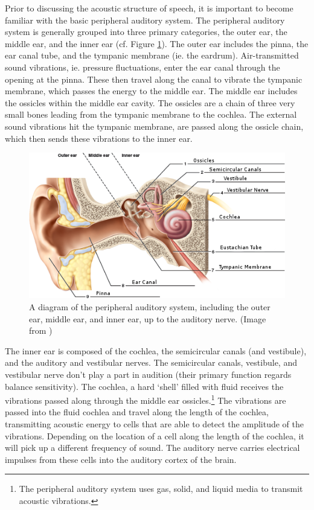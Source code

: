 \documentclass[dissertation,copyright]{uathesis}
\begin{document}
Prior to discussing the acoustic structure of speech, it is important to become familiar with the basic peripheral auditory system.  The peripheral auditory system is generally grouped into three primary categories, the outer ear, the middle ear, and the inner ear (cf. Figure \ref{fig:ear-anatomy}).  The outer ear includes the pinna, the ear canal tube, and the tympanic membrane (ie. the eardrum).  Air-transmitted sound vibrations, ie. pressure fluctuations, enter the ear canal through the opening at the pinna.  These then travel along the canal to vibrate the tympanic membrane, which passes the energy to the middle ear.  The middle ear includes the ossicles within the middle ear cavity.  The ossicles are a chain of three very small bones leading from the tympanic membrane to the cochlea. The external sound vibrations hit the tympanic membrane, are passed along the ossicle chain, which then sends these vibrations to the inner ear.

\begin{figure}[h]
\centering
  \includegraphics{figure/ear_anatomy.png}
  \caption{A diagram of the peripheral auditory system, including the outer ear, middle ear, and inner ear, up to the auditory nerve. (Image from \cite{martin:12})}
  \label{fig:ear-anatomy}
\end{figure}

The inner ear is composed of the cochlea, the semicircular canals (and vestibule), and the auditory and vestibular nerves.  The semicircular canals, vestibule, and vestibular nerve don't play a part in audition (their primary function regards balance sensitivity).  The cochlea, a hard `shell' filled with fluid receives the vibrations passed along through the middle ear ossicles.\footnote{The peripheral auditory system uses gas, solid, and liquid media to transmit acoustic vibrations.}  The vibrations are passed into the fluid cochlea and travel along the length of the cochlea, transmitting acoustic energy to cells that are able to detect the amplitude of the vibrations.  Depending on the location of a cell along the length of the cochlea, it will pick up a different frequency of sound.  The auditory nerve carries electrical impulses from these cells into the auditory cortex of the brain. 
\end{document}
